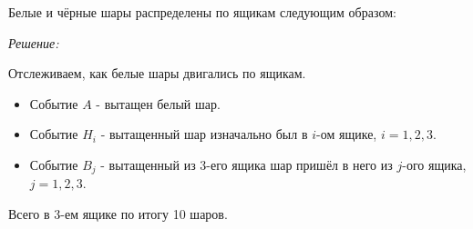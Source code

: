 



Белые и чёрные шары распределены по ящикам следующим образом:

\begin{figure}[H]
\end{figure}

\textit{Решение:}

Отслеживаем, как белые шары двигались по ящикам.

\begin{itemize}
	\item Событие $A$ - вытащен белый шар. 
	\item Событие $H_i$ - вытащенный шар изначально был в $i$-ом ящике, $i=1,2,3$.
	\item Событие $B_j$ - вытащенный из 3-его ящика шар пришёл в него из $j$-ого ящика, $j=1,2,3$.
\end{itemize}

Всего в 3-ем ящике по итогу 10 шаров.

\begin{figure}[H]
\end{figure}


